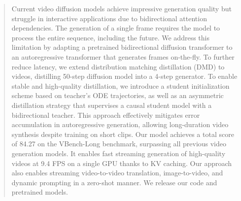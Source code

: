 \begin{abstract}
    Current video diffusion models achieve impressive generation quality but struggle in interactive applications due to bidirectional attention dependencies.
    The generation of a single frame requires the model to process the entire sequence, including the future.
    We address this limitation by adapting a pretrained bidirectional diffusion transformer to an autoregressive transformer that generates frames on-the-fly.
    To further reduce latency, we extend distribution matching distillation (DMD) to videos, distilling 50-step diffusion model into a 4-step generator.
    To enable stable and high-quality distillation, we introduce a student initialization scheme based on teacher's ODE trajectories, as well as an asymmetric distillation strategy that supervises a causal student model with a bidirectional teacher.
    This approach effectively mitigates error accumulation in autoregressive generation, allowing long-duration video synthesis despite training on short clips.
    Our model achieves a total score of 84.27 on the VBench-Long benchmark, surpassing all previous video generation models.    
    It enables fast streaming generation of high-quality videos at 9.4 FPS on a single GPU thanks to KV caching. Our approach also enables streaming video-to-video translation, image-to-video, and dynamic prompting in a zero-shot manner.
    We release our code and pretrained models.
\end{abstract}
